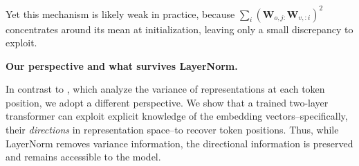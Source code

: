 \documentclass{article}
\theoremstyle{plain}
\theoremstyle{definition}
\theoremstyle{remark}
\begin{document}
Yet this mechanism is likely weak in practice, because $\sum_i \left( \mathbf{W}_{o,j:}\mathbf{W}_{v,:i} \right)^2$ concentrates around its mean at initialization, leaving only a small discrepancy to exploit.

\textbf{Our perspective and what survives LayerNorm.}

In contrast to \citet{chi-etal-2023-latent}, which analyze the variance of representations at each token position, we adopt a different perspective. We show that a trained two-layer transformer can exploit explicit knowledge of the embedding vectors--specifically, their \emph{directions} in representation space--to recover token positions. Thus, while LayerNorm removes variance information, the directional information is preserved and remains accessible to the model.


\begin{figure}[t]
\centering
{}
\end{figure}
\end{document}
